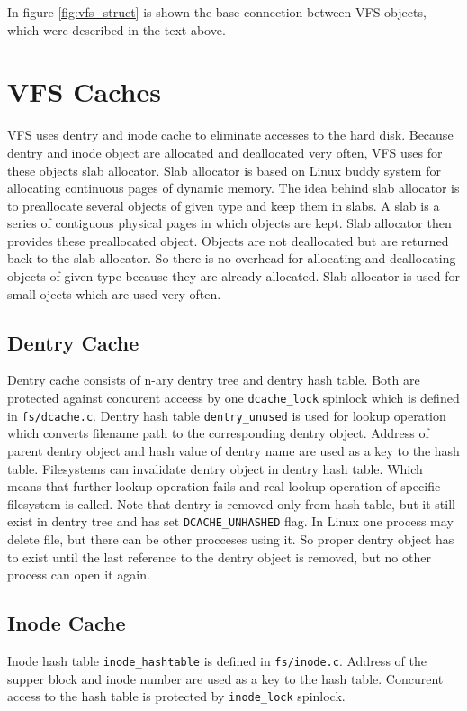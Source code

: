 In figure \ref{fig:vfs_struct} is shown the base connection between VFS objects, which
were described in the text above.

\section{VFS Caches}
\label{lab:cache}
VFS uses dentry and inode cache to eliminate accesses to the hard disk. Because dentry and
inode object are allocated and deallocated very often, VFS uses for these objects slab
allocator. Slab allocator is based on Linux buddy system for allocating continuous
pages of dynamic memory. The idea behind slab allocator is to preallocate several
objects of given type and keep them in slabs. A slab is a series of contiguous
physical pages in which objects are kept. Slab allocator then provides these
preallocated object. Objects are not deallocated but are returned back to the slab
allocator. So there is no overhead for allocating and deallocating objects of given
type because they are already allocated. Slab allocator is used for small ojects which
are used very often.

\subsection{Dentry Cache}
\label{lab:dentry_cache}
Dentry cache consists of n-ary dentry tree and dentry hash table. Both are protected
against concurent acceess by one \texttt{dcache\_lock} spinlock which is defined in
\texttt{fs/dcache.c}. Dentry hash table \texttt{dentry\_unused} is used for lookup
operation which converts filename path to the corresponding dentry object. Address of
parent dentry object and hash value of dentry name are used as a key to the hash table.
Filesystems can invalidate dentry object in dentry hash table. Which means that
further lookup operation fails and real lookup operation of specific filesystem is
called. Note that dentry is removed only from hash table, but it still exist in dentry
tree and has set \texttt{DCACHE\_UNHASHED} flag. In Linux one process may delete file,
but there can be other procceses using it. So proper dentry object has to exist until
the last reference to the dentry object is removed, but no other process can open it again. 

\subsection{Inode Cache}
\label{lab:inode_cache}
Inode hash table \texttt{inode\_hashtable} is defined in \texttt{fs/inode.c}. Address
of the supper block and inode number are used as a key to the hash table. Concurent
access to the hash table is protected by \texttt{inode\_lock} spinlock.

